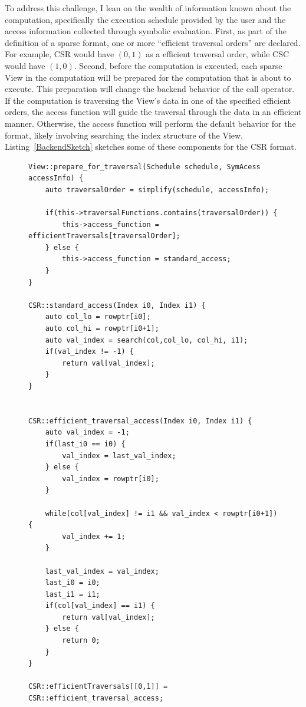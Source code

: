 \documentclass{article}
\begin{document}
To address this challenge, I lean on the wealth of information known about the computation, specifically the execution schedule provided by the user and the access information collected through symbolic evaluation. 
First, as part of the definition of a sparse format, one or more \enquote{efficient traversal orders} are declared. 
For example, CSR would have $(0,1)$ as a efficient traversal order, while CSC would have $(1,0)$.
Second, before the computation is executed, each sparse View in the computation will be prepared for the computation that is about to execute.
This preparation will change the backend behavior of the call operator.
If the computation is traversing the View's data in one of the specified efficient orders, the access function will guide the traversal through the data in an efficient manner.
Otherwise, the access function will perform the default behavior for the format, likely involving searching the index structure of the View.
Listing~\ref{BackendSketch} sketches some of these components for the CSR format. 

\begin{figure}
\begin{lstlisting}[caption={Sketch of the backend for efficient iteration}, label={BackendSketch}]
View::prepare_for_traversal(Schedule schedule, SymAcess accessInfo) {
    auto traversalOrder = simplify(schedule, accessInfo);

    if(this->traversalFunctions.contains(traversalOrder)) {
        this->access_function = efficientTraversals[traversalOrder];
    } else {
        this->access_function = standard_access;
    }
}

CSR::standard_access(Index i0, Index i1) {
    auto col_lo = rowptr[i0];
    auto col_hi = rowptr[i0+1];
    auto val_index = search(col,col_lo, col_hi, i1);
    if(val_index != -1) {
        return val[val_index];
    }
}


CSR::efficient_traversal_access(Index i0, Index i1) {
    auto val_index = -1;
    if(last_i0 == i0) {
        val_index = last_val_index;
    } else {
        val_index = rowptr[i0];
    }

    while(col[val_index] != i1 && val_index < rowptr[i0+1]) {
        val_index += 1;
    }

    last_val_index = val_index;
    last_i0 = i0;
    last_i1 = i1;
    if(col[val_index] == i1) {
        return val[val_index];
    } else {
        return 0;
    }
}

CSR::efficientTraversals[[0,1]] = CSR::efficient_traversal_access;
\end{lstlisting}
\end{figure}
\end{document}
